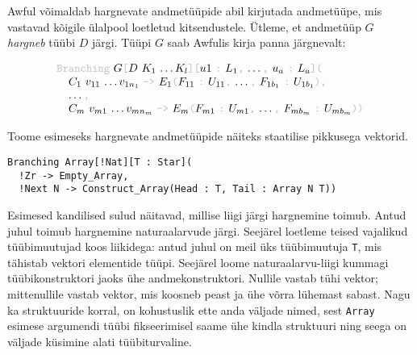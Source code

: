 \documentclass[12pt]{article}
\begin{document}
        Awful võimaldab hargnevate andmetüüpide abil kirjutada andmetüüpe, mis vastavad kõigile ülalpool loetletud kitsendustele. Ütleme, et andmetüüp $G$ \textit{hargneb} tüübi $D$ järgi. Tüüpi $G$ saab Awfulis kirja panna järgnevalt:

        \begin{equation*}
          \begin{tabular}{l}
            {\color{helehall}\verb!Branching!} $G${\color{helehall}\verb![!}$D$ $K_1$ \ldots $K_l${\color{helehall}\verb!][!}$u1$ {\color{helehall}\verb!:!} $L_1${\color{helehall}\verb!,!} \ldots{\color{helehall}\verb!,!} $u_a$ {\color{helehall}\verb!:!} $L_a${\color{helehall}\verb!](!} \\
            \verb!  !$C_1$ $v_{11}$ \ldots $v_{1n_1}$ {\color{helehall}\verb!->!} $E_1${\color{helehall}\verb!(!}$F_{11}$ {\color{helehall}\verb!:!} $U_{11}${\color{helehall}\verb!,!} \ldots{\color{helehall}\verb!,!} $F_{1b_1}$ {\color{helehall}\verb!:!} $U_{1b_1}${\color{helehall}\verb!),!}\\
            \verb!  !\ldots{\color{helehall}\verb!,!}\\
            \verb!  !$C_m$ $v_{m1}$ \ldots $v_{mn_m}$ {\color{helehall}\verb!->!} $E_m${\color{helehall}\verb!(!}$F_{m1}$ {\color{helehall}\verb!:!} $U_{m1}${\color{helehall}\verb!,!} \ldots{\color{helehall}\verb!,!} $F_{mb_m}$ {\color{helehall}\verb!:!} $U_{mb_m}${\color{helehall}\verb!))!}
          \end{tabular}
        \end{equation*}

        Toome esimeseks hargnevate andmetüüpide näiteks staatilise pikkusega vektorid.

        \begin{verbatim}Branching Array[!Nat][T : Star](
  !Zr -> Empty_Array,
  !Next N -> Construct_Array(Head : T, Tail : Array N T))\end{verbatim}

        Esimesed kandilised sulud näitavad, millise liigi järgi hargnemine toimub. Antud juhul toimub hargnemine naturaalarvude järgi. Seejärel loetleme teised vajalikud tüübimuutujad koos liikidega: antud juhul on meil üks tüübimuutuja \verb!T!, mis tähistab vektori elementide tüüpi. Seejärel loome naturaalarvu-liigi kummagi tüübikonstruktori jaoks ühe andmekonstruktori. Nullile vastab tühi vektor; mittenullile vastab vektor, mis koosneb peast ja ühe võrra lühemast sabast. Nagu ka struktuuride korral, on kohustuslik ette anda väljade nimed, sest \verb!Array! esimese argumendi tüübi fikseerimisel saame ühe kindla struktuuri ning seega on väljade küsimine alati tüübiturvaline.
\end{document}
